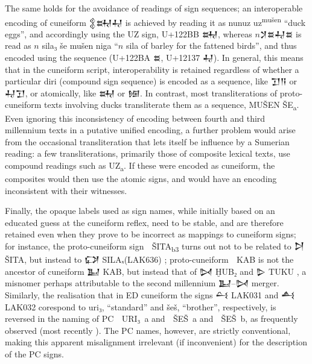 The same holds for the avoidance of readings of sign sequences; an
interoperable encoding of cunei\-form {\oraccnoto 𒉭𒊻𒄷} is achieved by
reading it as nunuz uz\textsuperscript{mušen} “duck eggs”, and
accordingly using the UZ sign, U+122BB {\oraccnoto 𒊻}, whereas
$n${\oraccnoto 𒋡𒊺𒄷𒊺} is read as $n$ sila₃ še mušen niga
“$n$ sila of barley for the fattened birds”, and thus
encoded using the sequence (U+122BA {\oraccnoto 𒊺}, U+12137
{\oraccnoto 𒄷}). In general, this means that in the cuneiform script,
interoperability is retained regardless of whether a particular diri
(compound sign sequence) is encoded as a sequence, like {\oraccnoto
𒋛𒀀} or {\oraccnoto 𒄷𒋛}, or atomically, like {\oraccnoto 𒊻} or
{\oraccnoto 𒎏}. In contrast, most transliterations of proto-cuneiform
texts involving ducks transliterate them as a sequence, MUŠEN
ŠE\textsubscript{a}. Even ignoring this inconsistency of encoding
between fourth and third millennium texts in a putative unified
encoding, a further problem would arise from the occasional
transliteration that lets itself be influence by a Sumerian reading: a
few transliterations, primarily those of composite lexical texts, use
compound readings such as UZ\textsubscript{a}. If these were encoded as cuneiform, the
composites would then use the atomic signs, and would have an encoding
inconsistent with their witnesses.

Finally, the opaque labels used as sign names, while initially based
on an educated guess at the cuneiform reflex, need to be stable, and
are therefore retained even when they prove to be incorrect as
mappings to cuneiform signs; for instance, the proto-cuneiform sign
{\oraccpc 𒩁} ŠITA\textsubscript{b3} turns out not to be related to
{\oraccnoto 𒋖} ŠITA, but instead to {\oraccnoto 𒔌}
SILAₓ(LAK636) \cite[220]{Wagensonner2016}; proto-cuneiform {\oraccpc
𒡱} KAB is not the ancestor of cuneiform {\oraccnoto 𒆏} KAB, but
instead that of {\oraccnoto 𒄸} ḪUB₂ and {\oraccnoto 𒌇}
TUKU \cite[274]{Wagensonner2016}, a misnomer perhaps attributable to
the second millennium {\oraccnoto 𒆏}–{\oraccnoto 𒄸} merger. Similarly,
the realisation that in ED cuneiform the signs {\oraccnoto 𒌶} LAK031
and {\oraccnoto 𒋀} LAK032 corespond to uri₃, ``standard'' and šeš,
``brother'', respectively, is reversed in the naming of PC {\oraccpc
𒫔} URI₃~a and {\oraccpc 𒨲} ŠEŠ~a and {\oraccpc 𒨳} ŠEŠ~b, as frequently
observed (most recently \cite[154-158]{Selz2025}). The PC names,
however, are strictly conventional, making this apparent misalignment
irrelevant (if inconvenient) for the description of the PC signs.

